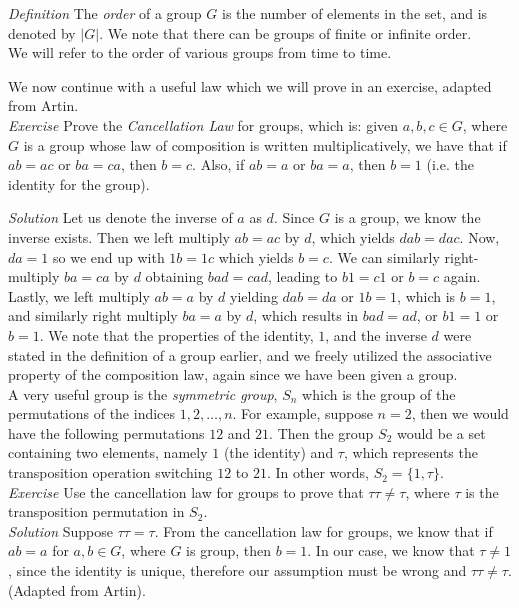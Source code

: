 \textit{Definition} The \textit{order} of a group $G$ is the number of elements in the set, and is denoted by $|G|$.  We note that there can be groups of finite or infinite order.\\  We will refer to the order of various groups from time to time.

We now continue with a useful law which we will prove in an exercise, adapted from Artin.\\

\textit{Exercise} Prove the \textit{Cancellation Law} for groups, which is: given $a,b,c \in G$, where $G$ is a group whose law of composition is written multiplicatively, we have that if $ab=ac$ or $ba=ca$, then $b=c$.  Also, if $ab=a$ or $ba=a$, then $b=1$ (i.e. the identity for the group).

\textit{Solution} Let us denote the inverse of $a$ as $d$.  Since $G$ is a group, we know the inverse exists.  Then we left multiply $ab=ac$ by $d$, which yields $dab=dac$.  Now, $da=1$ so we end up with $1b=1c$ which yields $b=c$.  We can similarly right-multiply $ba=ca$ by $d$ obtaining $bad=cad$, leading to $b1=c1$ or $b=c$ again.  Lastly, we left multiply $ab=a$ by $d$ yielding $dab=da$ or $1b=1$, which is $b=1$, and similarly right multiply $ba=a$ by $d$, which results in $bad=ad$, or $b1=1$ or $b=1$.  We note that the properties of the identity, $1$, and the inverse $d$ were stated in the definition of a group earlier, and we freely utilized the associative property of the composition law, again since we have been given a group.\\

A very useful group is the \textit{symmetric group}, $S_{n}$ which is the group of the permutations of the indices $1,2, \ldots, n$.  For example, suppose $n=2$, then we would have the following permutations $12$ and $21$.  Then the group $S_{2}$ would be a set containing two elements, namely $1$ (the identity) and $\tau$, which represents the transposition operation switching $12$ to $21$.  In other words, $S_{2}=\{1, \tau\}$.\\

\textit{Exercise} Use the cancellation law for groups to prove that $\tau \tau \ne \tau$, where $\tau$ is the transposition permutation in $S_{2}$.\\

\textit{Solution} Suppose $\tau \tau = \tau$.  From the cancellation law for groups, we know that if $ab=a$ for $a,b \in G$, where $G$ is group, then $b=1$.  In our case, we know that $\tau \ne 1$, since the identity is unique, therefore our assumption must be wrong and $\tau \tau \ne \tau$.  (Adapted from Artin).

